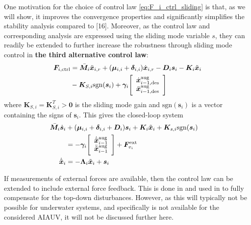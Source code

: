 \documentclass[../main.tex]{subfiles}
\begin{document}
One motivation for the choice of control law \eqref{eq:F_i_ctrl_sliding} is that, as we will show, it improves the convergence properties and significantly simplifies the stability analysis compared to [16]. Moreover, as the control law and corresponding analysis are expressed using the sliding mode variable $s$, they can readily be extended to further increase the robustness through sliding mode control in \textbf{the third alternative control law}:
\begin{align}
    \label{eq:F_i_ctrl_SMC}
    \bm{F}_{i,{\rm ctrl}}
    &=\bar{\bm{M}}_i \ddot{\bm{x}}_{i, r}
    + (\bm{\mu}_{i,i} + \bm{\delta}_{i,i} ) \dot{\bm{x}}_{i,r}
    - \bm{D}_i \bm{s}_i
    - \bm{K}_i \tilde{\bm{x}}_i \\
    &- \bm{K}_{S,i} \text{sgn} (\bm{s}_i)
    + \bm{\gamma}_i
    \Bigg[ \begin{array}{c}
        \dot{\bm{x}}_{i-1,{\rm des}}^{\rm aug} \\
        \ddot{\bm{x}}_{i-1,{\rm des}}^{\rm aug} \\
    \end{array}\Bigg] \nonumber
\end{align}
where $\bm{K}_{S,i} = \bm{K}_{S,i}^T > \bm{0}$ is the sliding mode gain and $\text{sgn} (\bm{s}_i)$ is a vector containing the signs of $\bm{s}_i$. This gives the closed-loop system
\begin{subequations}
    \label{eq:CL_SMC}
    \begin{flalign}
        \bar{\bm{M}}_i \dot{\bm{s}}_i
        &+ (\bm{\mu}_{i,i} + \bm{\delta}_{i,i} + \bm{D}_i)\bm{s}_i
        + \bm{K}_i \tilde{\bm{x}}_i
        + \bm{K}_{s,i} \text{sgn}(\bm{s}_i) && \raisetag{1.75\normalbaselineskip}\\
        &=
        - \bm{\gamma}_i\Bigg[
        \begin{array}{c}
            \dot{\tilde{\bm{x}}}_{i-1}^{\rm aug} \\
            \ddot{\tilde{\bm{x}}}_{i-1}^{\rm aug} \\
        \end{array}\Bigg]
        + \bm{F}_{v_i}^{\rm ext} \nonumber \\
        \dot{\tilde{\bm{x}}}_i &= - \bm{\Lambda}_i \tilde{\bm{x}}_i + \bm{s}_i
    \setlength{\abovedisplayskip}{0pt}
    \setlength{\belowdisplayskip}{0pt}
    \end{flalign}
\end{subequations}

\begin{remark}
    If measurements of external forces are available, then the control law can be extended to include external force feedback. This is done in \cite{dietrich2020} and used in \cite{Wu2022} to fully compensate for the top-down disturbances. However, as this will typically not be possible for underwater systems, and specifically is not available for the considered AIAUV, it will not be discussed further here.
\end{remark}
\end{document}
